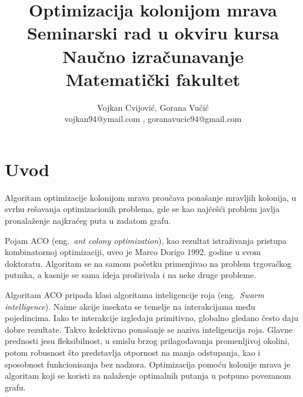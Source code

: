 \documentclass[a4paper]{article}
\begin{document}
\title{Optimizacija kolonijom mrava\\ 
\hfill \break
\small{Seminarski rad u okviru kursa\\Naučno izračunavanje\\ Matematički fakultet}}

\author{Vojkan Cvijović, Gorana Vučić\\ vojkan94@ymail.com , goranavucic94@gmail.com}


\maketitle

\abstract{

}


\tableofcontents

\newpage

\section{Uvod}
\label{sec:uvod}

Algoritam optimizacije kolonijom mrava proučava ponašanje mravljih kolonija, u svrhu rešavanja optimizacionih
problema, gde se kao najčešći problem javlja pronalaženje najkraćeg puta u zadatom grafu.

\vspace{3mm}

Pojam ACO (eng.~{\em ant colony optimization}), kao rezultat istraživanja pristupa kombinatornoj optimizaciji, uveo je Marco Dorigo 1992. godine u svom doktoratu. Algoritam se na samom početku primenjivao na problem trgovačkog putnika, a kasnije se sama ideja proširivala i na neke druge probleme.

\vspace{3mm}

Algoritam ACO pripada klasi algoritama inteligencije roja (eng.~{\em Swarm intelligence}). Naime akcije insekata se temelje na interakcijama među pojedincima. Iako te interakcije izgledaju primitivno, globalno gledano često daju dobre rezultate. Takvo kolektivno ponašanje se naziva inteligencija roja. Glavne prednosti jesu fleksibilnost, u smislu brzog prilagođavanja promenljivoj okolini, potom robusnost što predstavlja otpornost na manja odstupanja, kao i sposobnost funkcionisanja bez nadzora. Optimizacija pomoću kolonije mrava je algoritam koji se koristi za nalaženje optimalnih putanja u potpuno povezanom grafu.
\end{document}
